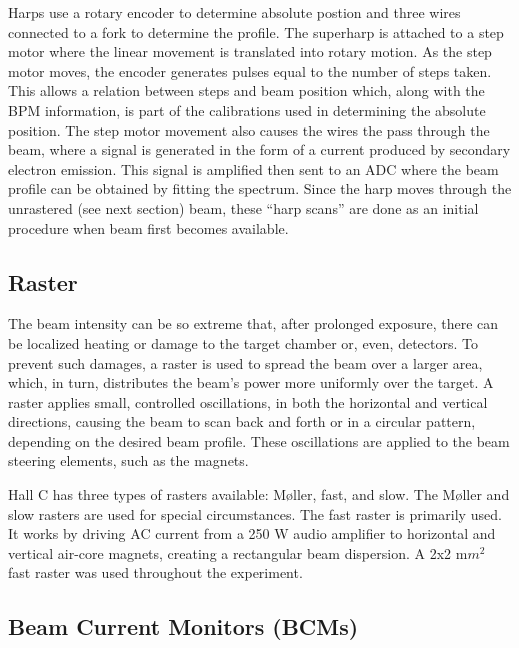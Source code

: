 \documentclass[
]{report}
\begin{document}
Harps use a rotary encoder to determine absolute postion and three wires
connected to a fork to determine the profile. The superharp is attached
to a step motor where the linear movement is translated into rotary
motion. As the step motor moves, the encoder generates pulses equal to
the number of steps taken. This allows a relation between steps and beam
position which, along with the BPM information, is part of the
calibrations used in determining the absolute position. The step motor
movement also causes the wires the pass through the beam, where a signal
is generated in the form of a current produced by secondary electron
emission. This signal is amplified then sent to an ADC where the beam
profile can be obtained by fitting the spectrum. Since the harp moves
through the unrastered (see next section) beam, these ``harp scans'' are
done as an initial procedure when beam first becomes available.

\hypertarget{raster}{%
\subsection{Raster}\label{raster}}

The beam intensity can be so extreme that, after prolonged exposure,
there can be localized heating or damage to the target chamber or, even,
detectors. To prevent such damages, a raster is used to spread the beam
over a larger area, which, in turn, distributes the beam's power more
uniformly over the target. A raster applies small, controlled
oscillations, in both the horizontal and vertical directions, causing
the beam to scan back and forth or in a circular pattern, depending on
the desired beam profile. These oscillations are applied to the beam
steering elements, such as the magnets.



Hall C has three types of rasters available: \(\text{M\o{}ller}\), fast,
and slow. The \(\text{M\o{}ller}\) and slow rasters are used for special
circumstances. The fast raster is primarily used. It works by driving AC
current from a 250 W audio amplifier to horizontal and vertical air-core
magnets, creating a rectangular beam dispersion. A 2x2 m\(m^2\) fast
raster was used throughout the experiment.

\hypertarget{beam-current-monitors-bcms}{%
\subsection{Beam Current Monitors
(BCMs)}\label{beam-current-monitors-bcms}}
\end{document}
